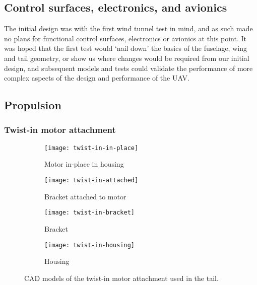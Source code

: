 \documentclass[../../main.tex]{subfiles}
\begin{document}
\subsection{Control surfaces, electronics, and avionics} \label{sec:design-process:initial-designs:control-surfaces-electronics-and-avionics}

The initial design was with the first wind tunnel test in mind, and as such made no plans for functional control surfaces, electronics or avionics at this point.
It was hoped that the first test would ‘nail down’ the basics of the fuselage, wing and tail geometry, or show us where changes would be required from our initial design, and subsequent models and tests could validate the performance of more complex aspects of the design and performance of the UAV. 

\subsection{Propulsion} \label{sec:design-process:initial-designs:propulsion}

\subsubsection{Twist-in motor attachment} \label{sec:design-process:initial-designs:propulsion:twist-in-motor-attachment}

\begin{figure}[H]
    \centering
    \begin{subfigure}[b]{0.49\columnwidth}
        \centering
        \texttt{[image: twist-in-in-place]}
        \caption{Motor in-place in housing}
        \label{fig:twist-in:in-place}
    \end{subfigure}
    \hfill
    \begin{subfigure}[b]{0.49\columnwidth}
        \centering
        \texttt{[image: twist-in-attached]}
        \caption{Bracket attached to motor}
        \label{fig:twist-in:attached}
    \end{subfigure}

    \begin{subfigure}[b]{0.49\columnwidth}
        \centering
        \texttt{[image: twist-in-bracket]}
        \caption{Bracket}
        \label{fig:twist-in:bracket}
    \end{subfigure}
    \hfill
    \begin{subfigure}[b]{0.49\columnwidth}
        \centering
        \texttt{[image: twist-in-housing]}
        \caption{Housing}
        \label{fig:twist-in:housing}
    \end{subfigure}
    \caption{CAD models of the twist-in motor attachment used in the tail.}
    \label{fig:twist-in}
\end{figure}
\end{document}
